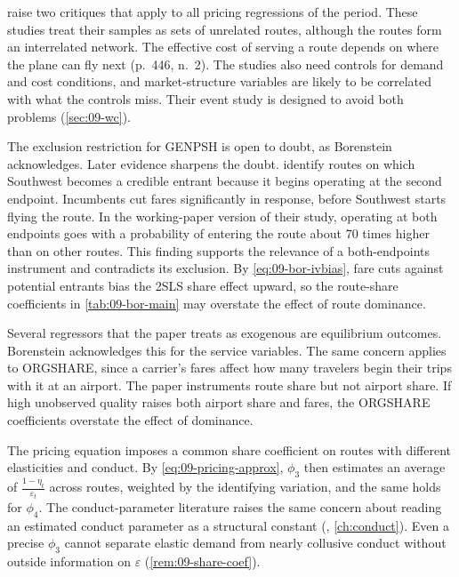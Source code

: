 \citet[p.~446]{WhinstonCollins1992} raise two critiques that apply to all pricing regressions of the period.
These studies treat their samples as sets of unrelated routes, although the routes form an interrelated network.
The effective cost of serving a route depends on where the plane can fly next (p.~446, n.~2). The studies
also need controls for demand and cost conditions, and market-structure variables are likely to be correlated
with what the controls miss. Their event study is designed to avoid both problems (\cref{sec:09-wc}).

The exclusion restriction for GENPSH is open to doubt, as Borenstein acknowledges. Later evidence sharpens the
doubt. \citet{GoolsbeeSyverson2008} identify routes on which Southwest becomes a credible entrant because it
begins operating at the second endpoint. Incumbents cut fares significantly in response, before Southwest starts
flying the route. In the working-paper version of their study, operating at both endpoints goes with a
probability of entering the route about 70 times higher than on other routes. This finding supports the
relevance of a both-endpoints instrument and contradicts its exclusion. By \cref{eq:09-bor-ivbias}, fare cuts
against potential entrants bias the 2SLS share effect upward, so the route-share coefficients in
\cref{tab:09-bor-main} may overstate the effect of route dominance.

Several regressors that the paper treats as exogenous are equilibrium outcomes. Borenstein acknowledges this for
the service variables. The same concern applies to ORGSHARE, since a carrier's fares affect how many travelers
begin their trips with it at an airport. The paper instruments route share but not airport share. If high
unobserved quality raises both airport share and fares, the ORGSHARE coefficients overstate the effect of
dominance.

The pricing equation imposes a common share coefficient on routes with different elasticities and conduct. By
\cref{eq:09-pricing-approx}, $\phi_3$ then estimates an average of $\frac{1 - \eta_t}{\varepsilon_t}$ across
routes, weighted by the identifying variation, and the same holds for $\phi_4$. The conduct-parameter literature
raises the same concern about reading an estimated conduct parameter as a structural constant
(\citealp{Corts1999}, \cref{ch:conduct}). Even a precise $\phi_3$ cannot separate elastic demand from nearly
collusive conduct without outside information on $\varepsilon$ (\cref{rem:09-share-coef}).

